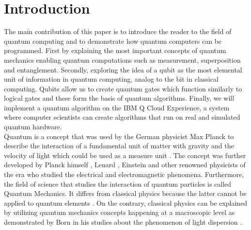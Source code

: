 \documentclass[12pt,a4paper]{scrartcl}
\begin{document}
\section{Introduction}\label{introduction}
The main contribution of this paper is to introduce the reader to the field of quantum computing and to demonstrate how quantum computers can be programmed. First by explaining the most important concepts of quantum mechanics enabling quantum computations such as measurement, superposition and entanglement. Secondly, exploring the idea of a qubit as the most elemental unit of information in quantum computing, analog to the bit in classical computing. Qubits allow us to create quantum gates which function similarly to logical gates and these form the basis of quantum algorithms. Finally, we will implement a quantum algorithm on the IBM Q Cloud Experience, a system where computer scientists can create algorithms that run on real and simulated quantum hardware. \\

Quantum is a concept that was used by the German physicist Max Planck to describe the interaction of a fundamental unit of matter with gravity and the velocity of light which could be used as a measure unit \cite{Longair2013}. The concept was further developed by Planck himself \cite{Planck1901}, Lenard \cite{Lenard1902}, Einstein \cite{Einstein1905}  and other renowned physicists of the era who studied the electrical and electromagnetic phenomena. Furthermore, the field of science that studies the interaction of quantum particles is called Quantum Mechanics. It differs from classical physics because the latter cannot be applied to quantum elements \cite{Longair2013}. On the contrary, classical physics can be explained by utilizing quantum mechanics concepts happening at a macroscopic level  \cite{Longair2013} as demonstrated by Born in his studies about the phenomenon of light dispersion \cite{Born1924}.\\
\end{document}
